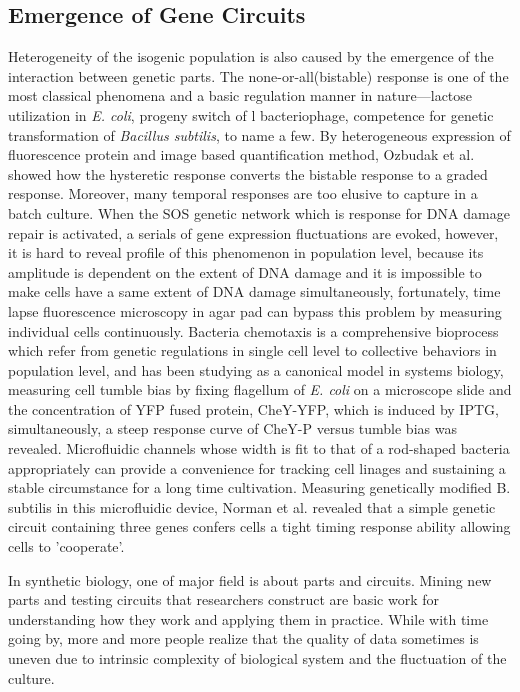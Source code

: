 \documentclass[fleqn,10pt]{wlscirep}
\begin{document}
\subsection[]{Emergence of Gene Circuits}

Heterogeneity of the isogenic population is also caused by the emergence of the interaction between genetic parts. The
none-or-all(bistable) response is one of the most classical phenomena and a basic regulation manner in nature—lactose
utilization in \textit{E. coli}, progeny switch of l bacteriophage, competence for genetic transformation of \textit{Bacillus subtilis}, to name a few. By heterogeneous expression of fluorescence protein and image based quantification method, Ozbudak et al.\cite{Ozbudak2004} showed how the hysteretic response converts the bistable response to a graded response. Moreover, many temporal responses are too elusive to capture in a batch culture. When the SOS genetic network which is response for DNA damage repair is activated, a serials of gene expression fluctuations are evoked, however, it is hard to reveal profile of this phenomenon in population level, because its amplitude is dependent on the extent of DNA damage and it is impossible to make cells have a same extent of DNA damage simultaneously, fortunately, time lapse fluorescence microscopy in agar pad can bypass this problem by measuring individual cells continuously\cite{Friedman2005}. Bacteria chemotaxis is a comprehensive bioprocess which refer from genetic regulations in single cell level to collective behaviors in population level, and has been studying as a canonical model in systems biology, measuring cell tumble bias by fixing flagellum of \textit{E. coli} on a microscope slide and the concentration of YFP fused protein, CheY-YFP, which is induced by IPTG, simultaneously, a steep response curve of CheY-P versus tumble bias was revealed\cite{Cluzel2000}. Microfluidic channels whose width is fit to that of a rod-shaped bacteria appropriately can provide a convenience for tracking cell linages and sustaining a stable circumstance for a long time cultivation. Measuring genetically modified B. subtilis in this microfluidic device, Norman et al.\cite{Norman2013} revealed that a simple genetic circuit containing three genes confers cells a tight timing response ability allowing cells to ’cooperate’.

In synthetic biology, one of major field is about parts and circuits\cite{Cameron2014}. Mining new parts and testing circuits that researchers construct are basic work for understanding how they work and applying them in practice.
While with time going by, more and more people realize that the quality of data sometimes is uneven due to
intrinsic complexity of biological system and the fluctuation of the culture.
\end{document}
